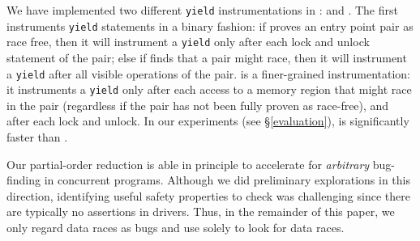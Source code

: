 We have implemented two different \texttt{yield} instrumentations in \whoop: \yieldcoarse and \yieldmr.
%
The first instruments \texttt{yield} statements in a binary fashion: if \whoop proves an entry point pair as race free, then it will instrument a \texttt{yield} only after each lock and unlock statement of the pair; else if \whoop finds that a pair might race, then it will instrument a \texttt{yield} after all visible operations of the pair.
%
\yieldmr is a finer-grained instrumentation: it instruments a \texttt{yield} only after each access to a memory region that might race in the pair (regardless if the pair has not been fully proven as race-free), and after each lock and unlock. In our experiments (see \S\ref{evaluation}), \yieldmr is significantly faster than \yieldcoarse.

Our partial-order reduction is able in principle to accelerate \corral for \emph{arbitrary} bug-finding in concurrent programs. Although we did preliminary explorations in this direction, identifying useful safety properties to check was challenging since there are typically no assertions in drivers. Thus, in the remainder of this paper, we only regard data races as bugs and use \corral solely to look for data races.
